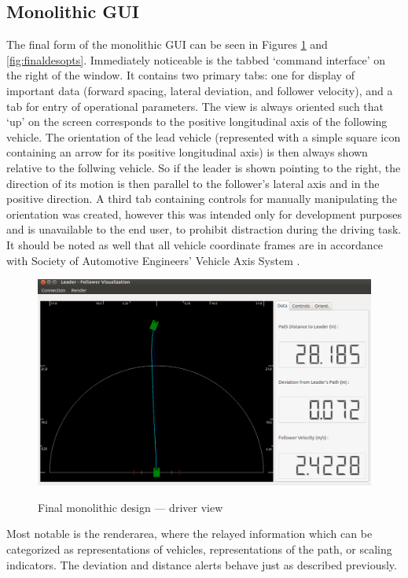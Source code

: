 \documentclass[12pt]{report}
\begin{document}
\subsection{Monolithic GUI} \label{sec:finaldes_monolith}
The final form of the monolithic GUI can be seen in Figures \ref{fig:finaldesdriv_monolith} and \ref{fig:finaldesopts}. Immediately noticeable is the tabbed `command interface' on the right of the window. It contains two primary tabs: one for display of important data (forward spacing, lateral deviation, and follower velocity), and a tab for entry of operational parameters. The view is always oriented such that `up' on the screen corresponds to the positive longitudinal axis of the following vehicle. The orientation of the lead vehicle (represented with a simple square icon containing an arrow for its positive longitudinal axis) is then always shown relative to the follwing vehicle. So if the leader is shown pointing to the right, the direction of its motion is then parallel to the follower's lateral axis and in the positive direction. A third tab containing controls for manually manipulating the orientation was created, however this was intended only for development purposes and is unavailable to the end user, to prohibit distraction during the driving task. It should be noted as well that all vehicle coordinate frames are in accordance with Society of Automotive Engineers' Vehicle Axis System \cite{vdbook}.

\begin{figure}[ht] \centering \label{fig:finaldesdriv_monolith}
    \includegraphics[width=5in]{./figs/final_design_data.png}
    \caption{Final monolithic design --- driver view}
\end{figure}

Most notable is the renderarea, where the relayed information which can be categorized as representations of vehicles, representations of the path, or scaling indicators.
The deviation and distance alerts behave just as described previously.
\end{document}

